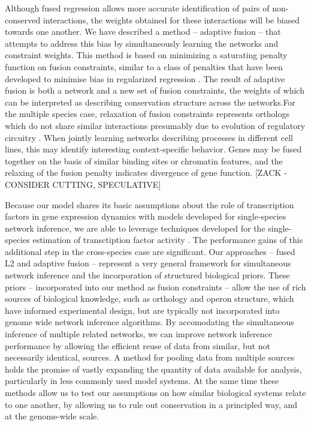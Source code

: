 \documentclass[11pt]{article}
\begin{document}
Although fused regression allows more accurate identification of pairs of non-conserved interactions, the weights obtained for these interactions will be biased towards one another. We have described a method -- adaptive fusion -- that attempts to address this bias by simultaneously learning the networks and constraint weights. This method is based on minimizing a saturating penalty function on fusion constraints, similar to a class of penalties that have been developed to minimise bias in regularized regression \cite{fan2001variable,zhang2010nearly}. 
The result of adaptive fusion is both a network and a new set of fusion constraints, the weights of which can be interpreted as describing conservation structure across the networks.For the multiple species case, relaxation of fusion constraints represents orthologs which do not share similar interactions presumably due to evolution of regulatory circuitry \cite{kellis_proof_2004}. %
When jointly learning networks describing processes in different cell lines, this may identify interesting context-specific behavior. Genes may be fused together on the basis of similar binding sites or chromatin features, and the relaxing of the fusion penalty indicates divergence of gene function. [ZACK - CONSIDER CUTTING, SPECULATIVE]

Because our model shares its basic assumptions about the role of transcription factors in gene expression dynamics with models developed for single-species network inference, we are able to leverage techniques developed for the single-species estimation of transctiption factor activity \cite{fu_reconstructing_2011}. 
The performance gains of this additional step in the cross-species case are significant.
Our approaches -- fused L2 and adaptive fusion -- represent a very general framework for simultaneous network inference and the incorporation of structured biological priors. 
These priors -- incorporated into our method as fusion constraints -- allow the use of rich sources of biological knowledge, such as orthology and operon structure, which have informed experimental design, but are typically not incorporated into genome wide network inference algorithms. 
By accomodating the simultaneous inference of multiple related networks, we can improve network inference performance by allowing the efficient reuse of data from similar, but not necessarily identical, sources. 
A method for pooling data from multiple sources holds the promise of vastly expanding the quantity of data available for analysis, particularly in less commonly used model systems. 
At the same time these methods allow us to test our assumptions on how similar biological systems relate to one another, by allowing us to rule out conservation in a principled way, and at the genome-wide scale. 
\end{document}
